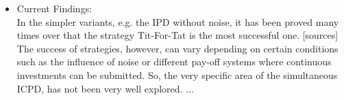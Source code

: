 \documentclass{article}
\begin{document}
\begin{itemize}
	\item Current Findings:\\

In the simpler variants, e.g. the IPD without noise, it has been proved many times over that the strategy Tit-For-Tat is the most successful one. [sources]
The success of strategies, however, can vary depending on certain conditions such as the influence of noise or different pay-off systems where continuous investments can be submitted.
So, the very specific area of the simultaneous ICPD, has not been very well explored.
...


\end{itemize}
\end{document}
